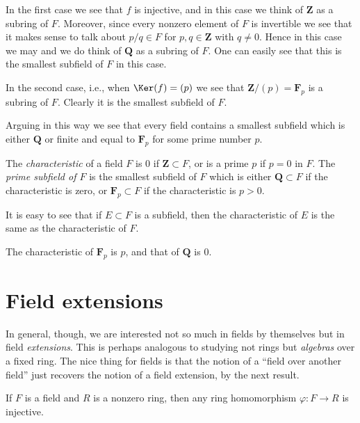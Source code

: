 \medskip\noindent
In the first case we see that $f$ is injective, and in this case
we think of $\mathbf{Z}$ as a subring of $F$. Moreover, since every
nonzero element of $F$ is invertible we see that it makes sense to
talk about $p/q \in F$ for $p, q \in \mathbf{Z}$ with $q \not = 0$.
Hence in this case we may and we do think of $\mathbf{Q}$ as a subring of $F$.
One can easily see that this is the smallest subfield of $F$ in this case.

\medskip\noindent
In the second case, i.e., when $\Ker(f) = (p)$ we see that
$\mathbf{Z}/(p) = \mathbf{F}_p$ is a subring of $F$. Clearly it is the
smallest subfield of $F$.

\medskip\noindent
Arguing in this way we see that every field contains a smallest subfield
which is either $\mathbf{Q}$ or finite and equal to $\mathbf{F}_p$ for some
prime number $p$.

\begin{definition}
\label{definition-characteristic}
The {\it characteristic} of a field $F$ is $0$ if
$\mathbf{Z} \subset F$, or is a prime $p$ if $p = 0$ in $F$.
The {\it prime subfield of $F$} is the smallest subfield of $F$
which is either $\mathbf{Q} \subset F$ if the characteristic is zero, or
$\mathbf{F}_p \subset F$ if the characteristic is $p > 0$.
\end{definition}

\noindent
It is easy to see that if $E \subset F$ is a subfield, then the
characteristic of $E$ is the same as the characteristic of $F$.

\begin{example}
\label{example-characteristic}
The characteristic of $\mathbf{F}_p$ is $p$, and that of $\mathbf{Q}$ is $0$.
\end{example}


\section{Field extensions}
\label{section-extensions}

\noindent
In general, though, we are interested not so much in fields by themselves but
in field {\it extensions}. This is perhaps analogous to studying not rings
but {\it algebras} over a fixed ring.
The nice thing for fields is that the notion of a ``field over another field''
just recovers the notion of a field extension, by the next result.

\begin{lemma}
\label{lemma-field-maps-injective}
If $F$ is a field and $R$ is a nonzero ring, then any ring homomorphism
$\varphi : F \to R$ is injective.
\end{lemma}

